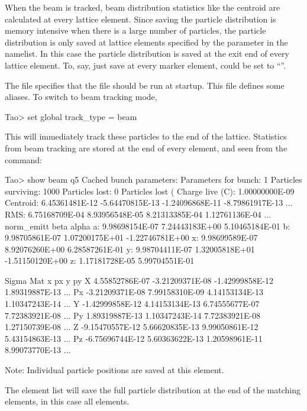 \documentclass{hitec}     %
\begin{document}
{When the beam is tracked, beam distribution statistics like the centroid are calculated at every
lattice element. Since saving the particle distribution is memory intensive when there is a large
number of particles, the particle distribution is only saved at lattice elements specified
by the  parameter in the  namelist. In this case the 
particle distribution is saved at the exit end of every lattice element. To, say, just save
at every marker element,  could be set to ``''.

The  file specifies that the  file should be run at startup. This
file defines some aliases. 
To switch to beam tracking mode, 
\begin{code}
Tao> set global track_type = beam
\end{code}
This will immediately track these particles to the end of the lattice. Statistics from beam tracking are stored at the end of every element, and seen from the  command:
\begin{code}
Tao> show beam q5
Cached bunch parameters:
  Parameters for bunch:       1
  Particles surviving:        1000
  Particles lost:             0
  Particles lost (%
  Charge live (C):              1.00000000E-09
  Centroid:  6.45361481E-12 -5.64470815E-13 -1.24096868E-11 -8.79861917E-13 ...
  RMS:       6.75168709E-04  8.93956548E-05  8.21313385E-04  1.12761136E-04 ...
             norm_emitt           beta             alpha
  a:         9.98698154E-07  7.24443183E+00  5.10465184E-01
  b:         9.98705861E-07  1.07200175E+01 -1.22746781E+00
  x:         9.98699589E-07  8.92076260E+00  6.28587261E-01
  y:         9.98704411E-07  1.32005818E+01 -1.51150120E+00
  z:         1.17181728E-05  5.99704551E-01

Sigma Mat       x              px               y              py      
X     4.55852786E-07 -3.21209371E-08 -1.42999858E-12  1.89319887E-13 ...
Px   -3.21209371E-08  7.99158310E-09  4.14153134E-13  1.10347243E-14 ...
Y    -1.42999858E-12  4.14153134E-13  6.74555677E-07  7.72383921E-08 ...
Py    1.89319887E-13  1.10347243E-14  7.72383921E-08  1.27150739E-08 ...
Z    -9.15470557E-12  5.66620835E-13  9.99050861E-12  5.43154863E-13 ...
Pz   -6.75696744E-12  5.60363622E-13  1.20598961E-11  8.99073770E-13 ...

Note: Individual particle positions are saved at this element.
\end{code}
The  element list will save the full particle distribution at the end of the matching elements, in this case all elements.  

}
\end{document}

